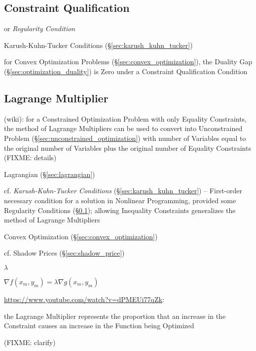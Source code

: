 \subsection{Constraint Qualification}\label{sec:constraint_qualification}

or \emph{Regularity Condition}

\fist Karush-Kuhn-Tucker Conditions (\S\ref{sec:karush_kuhn_tucker})

for Convex Optimization Problems (\S\ref{sec:convex_optimization}), the Duality
Gap (\S\ref{sec:optimization_duality}) is Zero under a Constraint Qualification
Condition



\subsection{Lagrange Multiplier}\label{sec:lagrange_multiplier}

(wiki): for a Constrained Optimization Problem with only Equality Constraints,
the method of Lagrange Multipliers can be used to convert into Unconstrained
Problem (\S\ref{sec:unconstrained_optimization}) with number of Variables equal
to the original number of Variables plus the original number of Equality
Constraints (FIXME: details)

\fist Lagrangian (\S\ref{sec:lagrangian})

\fist cf. \emph{Karush-Kuhn-Tucker Conditions} (\S\ref{sec:karush_kuhn_tucker})
-- First-order necessary condition for a solution in Nonlinear Programming,
provided some Regularity Conditions (\S\ref{sec:constraint_qualification});
allowing Inequality Constraints generalizes the method of Lagrange Multipliers

\fist Convex Optimization (\S\ref{sec:convex_optimization})

cf. Shadow Prices (\S\ref{sec:shadow_price})

$\lambda$

$\nabla f(x_m, y_m) = \lambda\nabla g(x_m, y_m)$

\url{https://www.youtube.com/watch?v=dPMEUi77qZk}:

the Lagrange Multiplier represents the proportion that an increase in the
Constraint causes an increase in the Function being Optimized

(FIXME: clarify)

